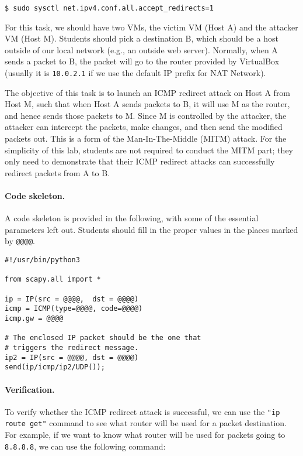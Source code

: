 \begin{lstlisting}
$ sudo sysctl net.ipv4.conf.all.accept_redirects=1
\end{lstlisting}

For this task, we should have two VMs, the victim VM (Host A) and 
the attacker VM (Host M). Students should pick a destination B, which
should be a host outside of our local network (e.g., an outside web server). 
Normally, when A sends a packet to B, the packet will go to the 
router provided by VirtualBox (usually it is \texttt{10.0.2.1} if we use
the default IP prefix for NAT Network). 

The objective of this task is to launch an ICMP redirect attack on Host A 
from Host M, such that when Host A sends packets to B, 
it will use M as the router, and hence sends those packets to M. 
Since M is controlled by the attacker, the attacker can 
intercept the packets, make changes, and then send 
the modified packets out. This is a form of the Man-In-The-Middle (MITM) attack. 
For the simplicity of this lab, students are not required to 
conduct the MITM part; they only need to demonstrate that 
their ICMP redirect attacks can successfully redirect
packets from A to B.


\paragraph{Code skeleton.} A code skeleton is provided in the following, with
some of the essential parameters left out. Students should fill in the proper 
values in the places marked by \texttt{@@@@}.  


\begin{lstlisting}
#!/usr/bin/python3

from scapy.all import *

ip = IP(src = @@@@,  dst = @@@@)
icmp = ICMP(type=@@@@, code=@@@@)
icmp.gw = @@@@

# The enclosed IP packet should be the one that 
# triggers the redirect message. 
ip2 = IP(src = @@@@, dst = @@@@)
send(ip/icmp/ip2/UDP());
\end{lstlisting}
 

\paragraph{Verification.}
To verify whether the ICMP redirect attack is successful, we can use 
the \texttt{"ip route get"} command to see what router will be used for a 
packet destination. For example, if we want to know
what router will be used for packets going to \texttt{8.8.8.8}, we can use 
the following command: 

